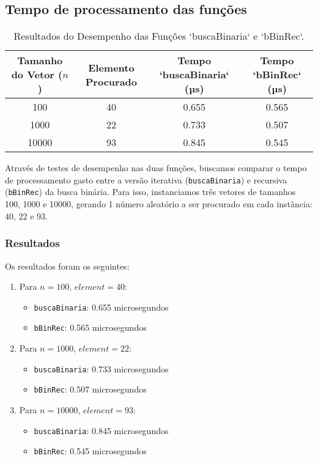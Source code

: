 \subsection{Tempo de processamento das funções}

\begin{table}[ht]
    \centering
    \caption{Resultados do Desempenho das Funções `buscaBinaria` e `bBinRec`.}
    \begin{tabular}{@{}cccc@{}}
        \toprule
        Tamanho do Vetor (\(n\)) & Elemento Procurado & Tempo `buscaBinaria` (µs) & Tempo `bBinRec` (µs) \\ \midrule
        100       & 40 & 0.655               & 0.565               \\
        1000      & 22 & 0.733              & 0.507              \\
        10000     & 93 & 0.845             & 0.545               \\ \bottomrule
    \end{tabular}
\end{table}

Através de testes de desempenho nas duas funções, buscamos comparar o tempo de processamento gasto entre a versão iterativa (\texttt{buscaBinaria}) e recursiva (\texttt{bBinRec}) da busca binária. Para isso, instanciamos três vetores de tamanhos 100, 1000 e 10000, gerando 1 número aleatório a ser procurado em cada instância: 40, 22 e 93.

\subsubsection{Resultados}
Os resultados foram os seguintes:

\begin{enumerate}
    \item Para \( n = 100 \), \( element = 40 \):
    \begin{itemize}
        \item \texttt{buscaBinaria}: 0.655 microsegundos
        \item \texttt{bBinRec}: 0.565 microsegundos
    \end{itemize}

    \item Para \( n = 1000 \), \( element = 22 \):
    \begin{itemize}
        \item \texttt{buscaBinaria}: 0.733 microsegundos
        \item \texttt{bBinRec}: 0.507 microsegundos
    \end{itemize}

    \item Para \( n = 10000 \), \( element = 93 \):
    \begin{itemize}
        \item \texttt{buscaBinaria}: 0.845 microsegundos
        \item \texttt{bBinRec}: 0.545 microsegundos
    \end{itemize}
\end{enumerate}

